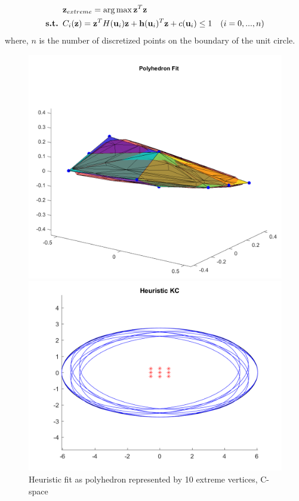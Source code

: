 \documentclass{article}
\begin{document}
\begin{enumerate}
\begin{enumerate}
\begin{equation}
\begin{aligned}
& {\bf z}_{extreme} = \arg\max {\bf z}^T {\bf z} \\
\text{{\bf s.t.   }} & C_i({\bf z}) = {\bf z}^T H({\bf u}_i) {\bf z} + {\bf h}({\bf u}_i)^T {\bf z} + c({\bf u}_i) \leq 1 & (i=0,...,n)\\
\end{aligned}
\end{equation}
where, $n$ is the number of discretized points on the boundary of the unit circle.

\begin{figure}[!b]
\centering
\begin{minipage}[b]{0.4\textwidth}
	\includegraphics[scale = 0.2]{fig/c-space-polyhedron-fit.png}
	\caption{Heuristic fit as polyhedron represented by 10 extreme vertices, C-space}
	\label{polyfit_cspace}
\end{minipage}
\hfill
\begin{minipage}[b]{0.4\textwidth}
	\includegraphics[scale = 0.25]{fig/ellipses-polyhedron-fit.png}

\end{minipage}
\end{figure}
\end{enumerate}
\end{enumerate}
\end{document}
